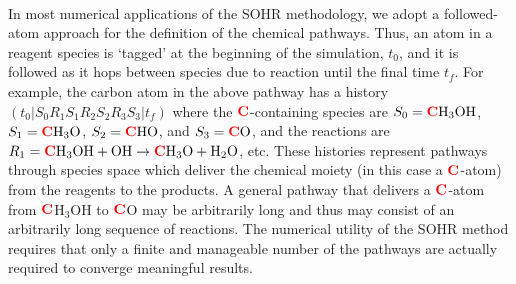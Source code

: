 \paragraph{}
In most numerical applications of the SOHR methodology, we adopt a followed-atom
approach for the definition of the chemical pathways. Thus, an atom in a reagent
species is ‘tagged’ at the beginning of the simulation, $t_0$, and it is followed as it hops
between species due to reaction until the final time $t_f$. For example, the carbon atom in
the above pathway has a history $(t_0 \vert S_0R_1S_1R_2S_2R_3S_3|t_f)$ where the $\textcolor{red}{\textbf{C}}$-containing species
are $S_0 = \textcolor{red}{\textbf{C}}\text{H}_3\text{OH}$, $S_1 =\textcolor{red}{\textbf{C}}\text{H}_3\text{O}$, $S_2 = \textcolor{red}{\textbf{C}}\text{HO}$, and $S_3 = \textcolor{red}{\textbf{C}}\text{O}$, and the reactions are
$R_1 = \textcolor{red}{\textbf{C}}\text{H}_3\text{OH} + \text{OH} \rightarrow \textcolor{red}{\textbf{C}}\text{H}_3\text{O} + \text{H}_2\text{O}$, etc. These histories represent pathways through
species space which deliver the chemical moiety (in this case a $\textcolor{red}{\textbf{C}}$-atom) from the
reagents to the products. A general pathway that delivers a $\textcolor{red}{\textbf{C}}$-atom from $\textcolor{red}{\textbf{C}}$H$_3$OH to $\textcolor{red}{\textbf{C}}$O
may be arbitrarily long and thus may consist of an arbitrarily long sequence of reactions.
The numerical utility of the SOHR method requires that only a finite and manageable
number of the pathways are actually required to converge meaningful results.
\newline
